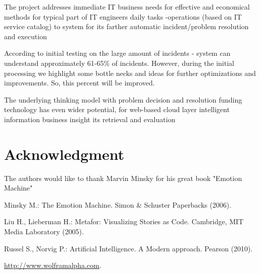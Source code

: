 \documentclass[conference]{IEEEtran}
\begin{document}
The project addresses immediate IT business needs for effective and economical methods for typical part of IT engineers daily tasks -operations (based on IT service catalog) to system for its farther automatic incident/problem resolution and execution

According to initial testing on the large amount of incidents - system can understand approximately 61-65\% of incidents. However, during the initial processing we highlight some bottle necks and ideas for further optimizations and improvements. So, this percent will be improved.

The underlying thinking model with problem decision and resolution funding technology has even wider potential, for web-based cloud layer intelligent information business insight its retrieval and evaluation
\section*{Acknowledgment}
The authors would like to thank Marvin Minsky for his great book "Emotion Machine" \cite{minsk}

\begin{thebibliography}{4}

Minsky M.:
The Emotion Machine.
Simon \& Schuster Paperbacks  (2006).

Liu H., Lieberman H.:
Metafor: Visualizing Stories as Code.
Cambridge, MIT Media Laboratory  (2005).

Russel S., Norvig P.:
Artificial Intelligence. A Modern approach.
Pearson (2010).

\href{http://www.wolframalpha.com}{http://www.wolframalpha.com}.

\end{thebibliography}
\end{document}
